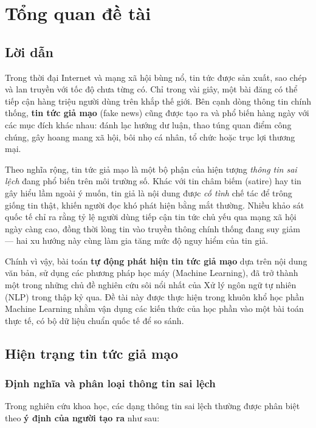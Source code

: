 \chapter[TỔNG QUAN ĐỀ TÀI]{Tổng quan đề tài}

\section{Lời dẫn}

Trong thời đại Internet và mạng xã hội bùng nổ, tin tức được sản xuất, sao chép và lan truyền với tốc độ chưa từng có. Chỉ trong vài giây, một bài đăng có thể tiếp cận hàng triệu người dùng trên khắp thế giới. Bên cạnh dòng thông tin chính thống, \textbf{tin tức giả mạo} (fake news) cũng được tạo ra và phổ biến hàng ngày với các mục đích khác nhau: đánh lạc hướng dư luận, thao túng quan điểm công chúng, gây hoang mang xã hội, bôi nhọ cá nhân, tổ chức hoặc trục lợi thương mại.

Theo nghĩa rộng, tin tức giả mạo là một bộ phận của hiện tượng \textit{thông tin sai lệch} đang phổ biến trên môi trường số. Khác với tin châm biếm (satire) hay tin gây hiểu lầm ngoài ý muốn, tin giả là nội dung được \textit{cố tình} chế tác để trông giống tin thật, khiến người đọc khó phát hiện bằng mắt thường. Nhiều khảo sát quốc tế chỉ ra rằng tỷ lệ người dùng tiếp cận tin tức chủ yếu qua mạng xã hội ngày càng cao, đồng thời lòng tin vào truyền thông chính thống đang suy giảm --- hai xu hướng này cùng làm gia tăng mức độ nguy hiểm của tin giả.

Chính vì vậy, bài toán \textbf{tự động phát hiện tin tức giả mạo} dựa trên nội dung văn bản, sử dụng các phương pháp học máy (Machine Learning), đã trở thành một trong những chủ đề nghiên cứu sôi nổi nhất của Xử lý ngôn ngữ tự nhiên (NLP) trong thập kỷ qua. Đề tài này được thực hiện trong khuôn khổ học phần Machine Learning nhằm vận dụng các kiến thức của học phần vào một bài toán thực tế, có bộ dữ liệu chuẩn quốc tế để so sánh.

\section{Hiện trạng tin tức giả mạo}

\subsection{Định nghĩa và phân loại thông tin sai lệch}

Trong nghiên cứu khoa học, các dạng thông tin sai lệch thường được phân biệt theo \textbf{ý định của người tạo ra} như sau:

